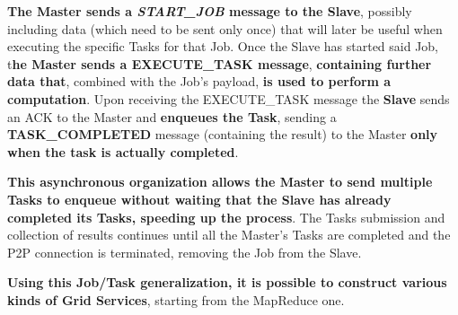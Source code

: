 \textbf{The Master sends a \textit{START\_JOB} message to the Slave}, possibly including data (which need to be sent only once) that will later be useful when executing the specific Tasks for that Job. Once the Slave has started said Job, t\textbf{he Master sends a \textbf{EXECUTE\_TASK} message}, \textbf{containing further data that}, combined with the Job's payload, \textbf{is used to perform a computation}. Upon receiving the EXECUTE\_TASK message the \textbf{Slave} sends an ACK to the Master and \textbf{enqueues the Task}, sending a \textbf{\textbf{TASK\_COMPLETED}} message (containing the result) to the Master \textbf{only when the task is actually completed}.

\textbf{This asynchronous organization allows the Master to send multiple Tasks to enqueue without waiting that the Slave has already completed its Tasks, speeding up the process}.
The Tasks submission and collection of results continues until all the Master's Tasks are completed and the P2P connection is terminated, removing the Job from the Slave.

\textbf{Using this Job/Task generalization, it is possible to construct various kinds of Grid Services}, starting from the MapReduce one.
